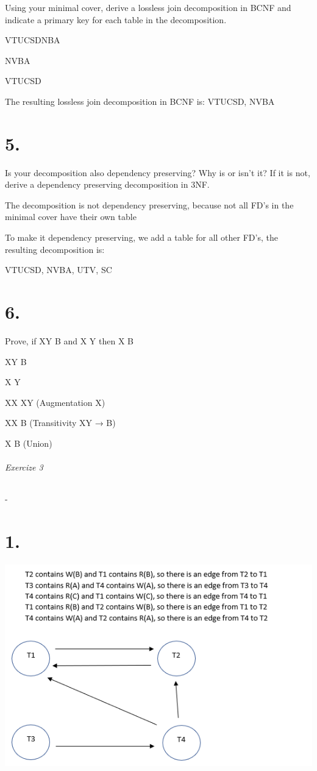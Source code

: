 \documentclass{article}
\begin{document}
Using your minimal cover, derive a lossless join decomposition in BCNF and indicate a primary key for each table in the decomposition.
\newline

VTUCSDNBA

\Downarrow \> \Rightarrow NVBA

VTUCSD
	  
	The resulting lossless join decomposition in BCNF is: VTUCSD, NVBA

\chapter{5.}

Is your decomposition also dependency preserving? Why is or isn’t it? If it is not, derive a dependency preserving decomposition in 3NF.
\newline

The decomposition is not dependency preserving, because not all FD’s in the minimal cover have their own table


To make it dependency preserving, we add a table for all other FD’s, the resulting decomposition is:


VTUCSD, NVBA, UTV, SC

\chapter{6.}

Prove, if XY \rightarrow B and X \rightarrow Y then X \rightarrow B

	XY \rightarrow B
	
	X \rightarrow Y
	
	XX \rightarrow XY								(Augmentation X)
	
	XX \rightarrow B									(Transitivity XY → B)
	
	X \rightarrow B									(Union)	


\newline

\subparagraph*{Exercize 3}
-

\chapter{1.}

\includegraphics{./schema.png}
\end{document}
